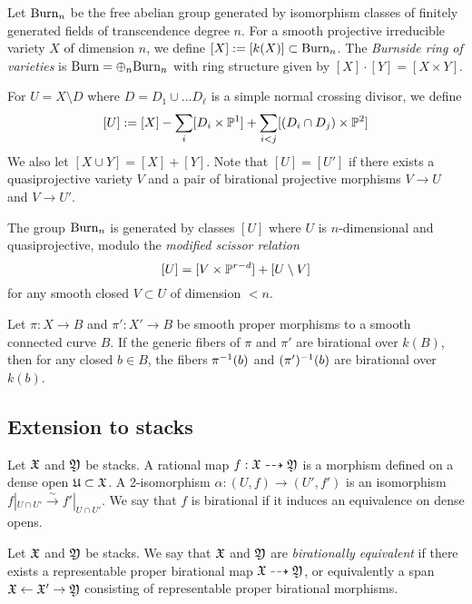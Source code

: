 \documentclass{amsart}
\begin{document}
\begin{dfn}
	Let $\mathrm{Burn}_n$ be the free abelian group generated by isomorphism classes of finitely generated fields of transcendence degree $n$. 
	For a smooth projective irreducible variety $X$ of dimension $n$, we define $[X] := [k(X)] \subset \mathrm{Burn}_n$.
	The \emph{Burnside ring of varieties} is $\mathrm{Burn} = \oplus_n \mathrm{Burn}_n$ with ring structure given by $[X] \cdot [Y] = [X \times Y]$.
\end{dfn}

For $U = X \setminus D$ where $D = D_1 \cup \dots D_\ell$ is a simple normal crossing divisor, we define
\[
	[U] := [X] - \sum_i [D_i \times \mathbb{P}^1] + \sum_{i < j} [(D_i \cap D_j) \times \mathbb{P}^2]
\]
We also let $[X \cup Y] = [X] + [Y]$.
Note that $[U] = [U']$ if there exists a quasiprojective variety $V$ and a pair of birational projective morphisms $V \to U$ and $V \to U'$.

\begin{prop}
	The group $\mathrm{Burn}_n$ is generated by classes $[U]$ where $U$ is $n$-dimensional and quasiprojective, modulo the \emph{modified scissor relation}
	\[
		[U] = [V \times \mathbb{P}^{r-d}] + [U \setminus V]
	\]
	for any smooth closed $V \subset U$ of dimension $< n$.
\end{prop}

\begin{prop}[Specialization]
	Let $\pi: X \to B$ and $\pi': X' \to B$ be smooth proper morphisms to a smooth connected curve $B$.
	If the generic fibers of $\pi$ and $\pi'$ are birational over $k(B)$, then for any closed $b \in B$, the fibers $\pi^{-1}(b)$ and $(\pi')^{-1}(b)$ are birational over $k(b)$.
\end{prop}

\subsection{Extension to stacks}

\begin{dfn}
	Let $\mathfrak{X}$ and $\mathfrak{Y}$ be stacks.
	A rational map $f: \mathfrak{X} \dashrightarrow \mathfrak{Y}$ is a morphism defined on a dense open $\mathfrak{U} \subset \mathfrak{X}$.
	A 2-isomorphism $\alpha: (U, f) \to (U', f')$ is an isomorphism $f|_{U \cap U'} \xrightarrow{\sim} f'|_{U \cap U'}$.
	We say that $f$ is birational if it induces an equivalence on dense opens.
\end{dfn}

\begin{dfn}
	Let $\mathfrak{X}$ and $\mathfrak{Y}$ be stacks.
	We say that $\mathfrak{X}$ and $\mathfrak{Y}$ are \emph{birationally equivalent} if there exists a representable proper birational map $\mathfrak{X} \dashrightarrow \mathfrak{Y}$, or equivalently a span $\mathfrak{X} \leftarrow \mathfrak{X}' \rightarrow \mathfrak{Y}$ consisting of representable proper birational morphisms.
\end{dfn}
\end{document}
